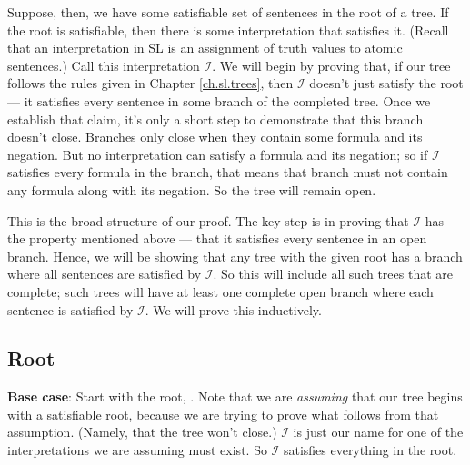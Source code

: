 Suppose, then, we have some satisfiable set of sentences \metaSetX{} in the root of a tree. If the root is satisfiable, then there is some interpretation that satisfies it. (Recall that an interpretation in SL is an assignment of truth values to atomic sentences.) Call this interpretation $\mathcal{I}$. We will begin by proving that, if our tree follows the rules given in Chapter \ref{ch.sl.trees}, then $\mathcal{I}$ doesn't just satisfy the root --- it satisfies every sentence in some branch of the completed tree. Once we establish that claim, it's only a short step to demonstrate that this branch doesn't close. Branches only close when they contain some formula and its negation. But no interpretation can satisfy a formula and its negation; so if $\mathcal{I}$ satisfies every formula in the branch, that means that branch must not contain any formula along with its negation. So the tree will remain open.

This is the broad structure of our proof. The key step is in proving that $\mathcal{I}$ has the property mentioned above --- that it satisfies every sentence in an open branch. {\color{black} Hence, we will be showing that any tree with the given root has a branch where all sentences are satisfied by $\mathcal{I}$. So this will include all such trees that are complete; such trees will have at least one complete open branch where each sentence is satisfied by $\mathcal{I}$.} We will prove this inductively.

\subsection{Root}

\textbf{Base case}: Start with the root, \metaSetX{}. Note that we are \emph{assuming} that our tree begins with a satisfiable root, because we are trying to prove what follows from that assumption. (Namely, that the tree won't close.) $\mathcal{I}$ is just our name for one of the interpretations we are assuming must exist. So $\mathcal{I}$ satisfies everything in the root. 



